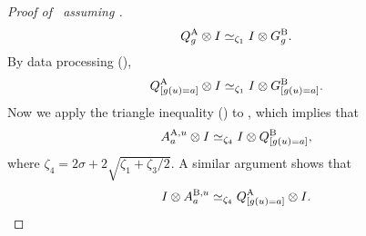 \begin{proof}[Proof of~ assuming ]
\begin{equation*}
Q^{\mathrm{A}}_g \otimes I \simeq_{\zeta_1} I \otimes G^{\mathrm{B}}_g.
\end{equation*}
By data processing (),
\begin{equation}\label{eq:ok-almost-there-ok}
Q^{\mathrm{A}}_{[g(u)=a]} \otimes I \simeq_{\zeta_1} I \otimes G^{\mathrm{B}}_{[g(u)=a]}.
\end{equation}
Now we apply the triangle inequality ()
to ,
which implies that
\begin{equation}\label{eq:one-goal}
A^{\mathrm{A},u}_a \otimes I \simeq_{\zeta_4} I \otimes Q^{\mathrm{B}}_{[g(u)=a]},
\end{equation}
where $\zeta_4 = 2\sigma + 2 \sqrt{\zeta_1 + \zeta_3/2}$.
A similar argument shows that
\begin{equation}\label{eq:another-goal}
I \otimes A^{\mathrm{B},u}_a \simeq_{\zeta_4} Q^{\mathrm{A}}_{[g(u)=a]} \otimes I.
\end{equation}


\end{proof}
